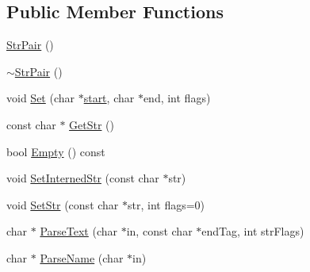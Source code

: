 \subsection*{Public Member Functions}
\begin{DoxyCompactItemize}
\item 
\hyperlink{classtinyxml2_1_1_str_pair_a69153963f7052de9f767d3d8c1623a70}{Str\-Pair} ()
\item 
\hyperlink{classtinyxml2_1_1_str_pair_a60bed84d2503296e1c2a73fcef1431f9}{$\sim$\-Str\-Pair} ()
\item 
void \hyperlink{classtinyxml2_1_1_str_pair_a4f05549373394266a1eecba26813c166}{Set} (char $\ast$\hyperlink{_x_d_l___main_8cpp_a2182b4f4175ea78bf91a9b7a78fa1c0a}{start}, char $\ast$end, int flags)
\item 
const char $\ast$ \hyperlink{classtinyxml2_1_1_str_pair_ad87e3d11330f5e689ba1e7e54c023b57}{Get\-Str} ()
\item 
bool \hyperlink{classtinyxml2_1_1_str_pair_affa1043e73a18f05d5d2faec055725a7}{Empty} () const 
\item 
void \hyperlink{classtinyxml2_1_1_str_pair_a2baf6230e18333e02ab65d0897ee3941}{Set\-Interned\-Str} (const char $\ast$str)
\item 
void \hyperlink{classtinyxml2_1_1_str_pair_a1f82ec6b5bee35ee7466d8565e43b1de}{Set\-Str} (const char $\ast$str, int flags=0)
\item 
char $\ast$ \hyperlink{classtinyxml2_1_1_str_pair_ad90521f188e9606a8fbafe5d86fb2246}{Parse\-Text} (char $\ast$in, const char $\ast$end\-Tag, int str\-Flags)
\item 
char $\ast$ \hyperlink{classtinyxml2_1_1_str_pair_aa6d8998efceba41d87ec2300c70a6085}{Parse\-Name} (char $\ast$in)
\end{DoxyCompactItemize}


